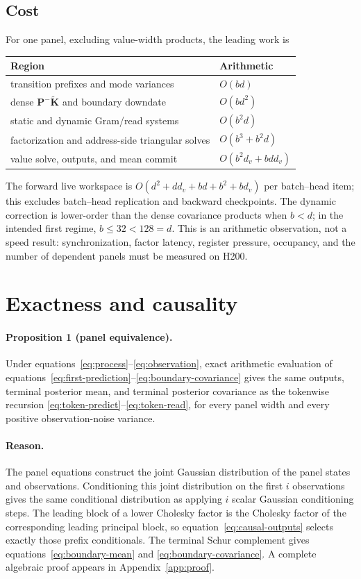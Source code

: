 \documentclass[11pt]{article}
\newcommand{\ve}[1]{\boldsymbol{#1}}
\begin{document}
\subsection{Cost}

For one panel, excluding value-width products, the leading work is
\begin{center}
\begin{tabular}{ll}
\toprule
Region & Arithmetic \\
\midrule
transition prefixes and mode variances & $O(bd)$ \\
dense $\ve{P}^-\widetilde{\ve{K}}$ and boundary downdate & $O(bd^2)$ \\
static and dynamic Gram/read systems & $O(b^2d)$ \\
factorization and address-side triangular solves & $O(b^3+b^2d)$ \\
value solve, outputs, and mean commit & $O(b^2d_v+b d d_v)$ \\
\bottomrule
\end{tabular}
\end{center}
The forward live workspace is $O(d^2+d d_v+bd+b^2+bd_v)$ per batch--head item; this excludes
batch--head replication and backward checkpoints.  The dynamic correction is lower-order
than the dense covariance products when $b<d$; in the intended first regime,
$b\leq32<128=d$.  This is an arithmetic observation, not a speed result: synchronization, factor
latency, register pressure, occupancy, and the number of dependent panels must be measured on H200.

\section{Exactness and causality}

\paragraph{Proposition 1 (panel equivalence).}
Under equations~\eqref{eq:process}--\eqref{eq:observation}, exact arithmetic evaluation of
equations~\eqref{eq:first-prediction}--\eqref{eq:boundary-covariance} gives the same outputs,
terminal posterior mean, and terminal posterior covariance as the tokenwise recursion
\eqref{eq:token-predict}--\eqref{eq:token-read}, for every panel width and every positive
observation-noise variance.

\paragraph{Reason.}
The panel equations construct the joint Gaussian distribution of the panel states and
observations.  Conditioning this joint distribution on the first $i$ observations gives the same
conditional distribution as applying $i$ scalar Gaussian conditioning steps.  The leading block
of a lower Cholesky factor is the Cholesky factor of the corresponding leading principal block,
so equation~\eqref{eq:causal-outputs} selects exactly those prefix conditionals.  The terminal
Schur complement gives equations~\eqref{eq:boundary-mean} and
\eqref{eq:boundary-covariance}.  A complete algebraic proof appears in Appendix~\ref{app:proof}.
\end{document}
